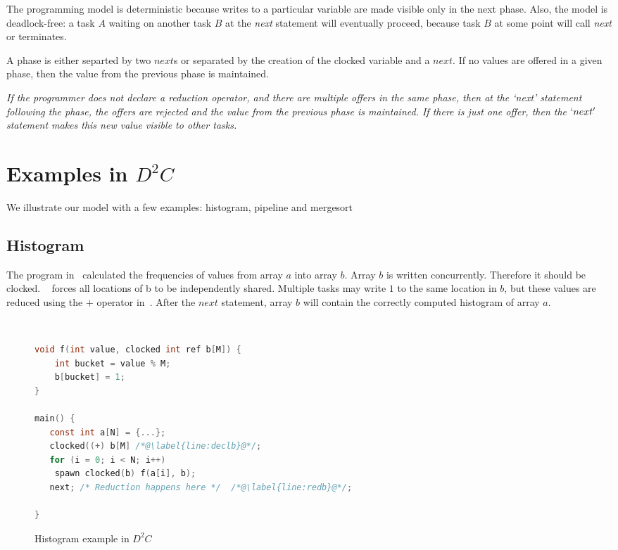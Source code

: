 \documentclass[10pt, conference, compsocconf]{IEEEtran}
\begin{document}
\begin{lstlisting}

\end{lstlisting}

The programming model is deterministic because writes to a particular variable
are made visible only in the next phase. Also, the model is deadlock-free: a task $A$ waiting on another task $B$ at the \emph{next} statement will eventually
proceed, because task $B$ at some point will call \emph{next} or terminates.

A phase is either separted by two $next$s or separated
by the creation of the clocked variable and a $next$.
If no values are offered in a given phase, then the value from
the previous phase is maintained.

{\it If the programmer does not declare a reduction operator, and there are multiple offers in the same phase, then  at the `next' statement following
the phase, the offers are rejected and the value from
the previous phase is maintained. If there is just one offer, then the $`next'$ statement makes this new value visible to other tasks.}


\section{Examples in $D^2C$}
\label{sec:examples}
We illustrate our model with a few examples: 
histogram, pipeline and mergesort

\subsection{Histogram}
The program in~ calculated the frequencies
of values from array $a$ 
into array $b$.
Array $b$ is written concurrently. Therefore it should be clocked.
~ forces all locations of b to be independently shared.
Multiple tasks may write $1$ to the same location in $b$, but these
values are reduced using the $+$ operator in~. After the 
$next$ statement, array $b$ will contain the correctly computed histogram
of array $a$. 

\
\begin{figure}
\begin{lstlisting}[language=C]
void f(int value, clocked int ref b[M]) {
	int bucket = value % M;
	b[bucket] = 1; 
}

main() {
   const int a[N] = {...};
   clocked((+) b[M] /*@\label{line:declb}@*/;
   for (i = 0; i < N; i++)
	spawn clocked(b) f(a[i], b); 
   next; /* Reduction happens here */  /*@\label{line:redb}@*/;

}
\end{lstlisting}
\caption{Histogram example in $D^2C$}
\label{fig:histogram}
\end{figure}
\end{document}
